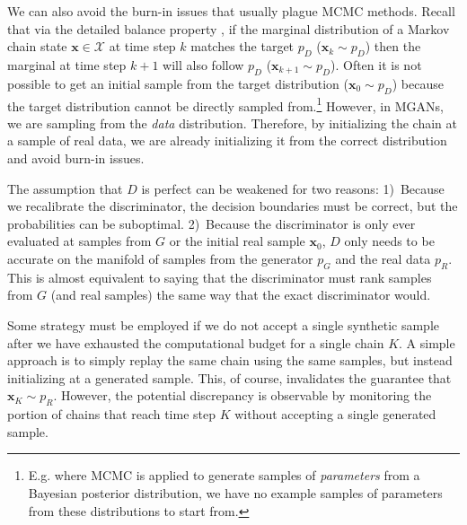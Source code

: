 \documentclass{article}
\renewcommand{\vec}[1]{{\boldsymbol{\mathbf{#1}}}} %
\newcommand{\set}[1]{\mathcal{#1}}
\newcommand{\sample}{\sim}
\newcommand{\PG}{{p_G}}
\newcommand{\PD}{{p_D}}
\newcommand{\PR}{{p_R}}
\newcommand{\setx}{\set{X}}
\begin{document}

We can also avoid the burn-in issues that usually plague MCMC methods.
Recall that via the detailed balance property , if the marginal distribution of a Markov chain state $\vec x \in \setx$ at time step $k$ matches the target $\PD$ ($\vec x_k \sample \PD$) then the marginal at time step $k+1$ will also follow $\PD$ ($\vec x_{k+1} \sample \PD$)\@.
Often it is not possible to get an initial sample from the target distribution ($\vec x_0 \sample \PD$) because
the target distribution cannot be directly sampled from.\footnote{E.g. where MCMC is applied to generate samples of \emph{parameters} from a Bayesian posterior distribution, we have no example samples of parameters from these distributions to start from. }
However, in MGANs, we are sampling from the \emph{data} distribution.
Therefore, by initializing the chain at a sample of real data, we are already initializing it from the correct distribution and avoid burn-in issues.



The assumption that $D$ is perfect can be weakened for two reasons:
1)~Because we recalibrate the discriminator, the decision boundaries must be correct, but the probabilities can be suboptimal.
2)~Because the discriminator is only ever evaluated at samples from $G$ or the initial real sample $\vec x_0$, $D$ only needs to be accurate on the manifold of samples from the generator $\PG$ and the real data $\PR$.
This is almost equivalent to saying that the discriminator must rank samples from $G$ (and real samples) the same way that the exact discriminator would.

Some strategy must be employed if we do not accept a single synthetic sample after we have exhausted the computational budget for a single chain $K$.
A simple approach is to simply replay the same chain using the same samples, but instead initializing at a generated sample.
This, of course, invalidates the guarantee that $\vec x_K \sample \PR$.
However, the potential discrepancy is observable by monitoring the portion of chains that reach time step $K$ without accepting a single generated sample.

\end{document}

